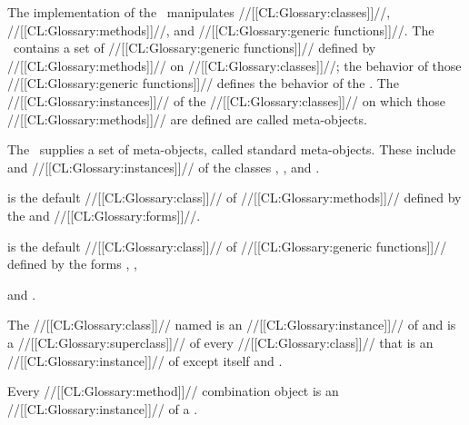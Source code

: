 




The implementation of the \OS\ manipulates //[[CL:Glossary:classes]]//, //[[CL:Glossary:methods]]//,
and //[[CL:Glossary:generic functions]]//.  The \OS\ contains a set of 
//[[CL:Glossary:generic functions]]// defined by //[[CL:Glossary:methods]]// on //[[CL:Glossary:classes]]//; 
the behavior of those //[[CL:Glossary:generic functions]]// defines the behavior of
the \OS.  The //[[CL:Glossary:instances]]// of the //[[CL:Glossary:classes]]// on which those
//[[CL:Glossary:methods]]// are defined are called meta-objects.  






The \OS\ supplies a set of meta-objects, called standard meta-objects.
These include  and
//[[CL:Glossary:instances]]// of the classes , 
, and .

\beginlist

\itemitem{\bull} 
 is the default //[[CL:Glossary:class]]// of 
//[[CL:Glossary:methods]]// defined by the 
  and
  //[[CL:Glossary:forms]]//.









\itemitem{\bull}
 is the default //[[CL:Glossary:class]]// of 
//[[CL:Glossary:generic functions]]// defined by the forms
  ,
  ,






 and
  .

\itemitem{\bull} The //[[CL:Glossary:class]]// named  
is an //[[CL:Glossary:instance]]// of  
and is a //[[CL:Glossary:superclass]]// of every //[[CL:Glossary:class]]// that is an
//[[CL:Glossary:instance]]// of  except itself and 
.

\itemitem{\bull} Every //[[CL:Glossary:method]]// combination object is 
an //[[CL:Glossary:instance]]// of a .

\endlist

\endsubsection%

